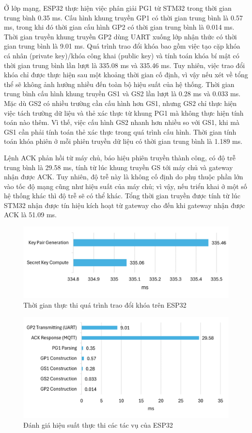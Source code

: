 Ở lớp mạng, ESP32 thực hiện việc phân giải PG1 từ STM32 trong thời gian trung bình 0.35 ms. Cấu hình khung truyền GP1 có thời gian trung bình là 0.57 ms, trong khi đó thời gian cấu hình GP2 có thời gian trung bình là 0.014 ms. Thời gian truyền khung truyền GP2 dùng UART xuống lớp nhận thức có thời gian trung bình là 9.01 ms. Quá trình trao đổi khóa bao gồm việc tạo cặp khóa cá nhân (private key)/khóa công khai (public key) và tính toán khóa bí mật có thời gian trung bình lần lượt là 335.08 ms và 335.46 ms. Tuy nhiên, việc trao đổi khóa chỉ được thực hiện sau một khoảng thời gian cố định, vì vậy nếu xét về tổng thể sẽ không ảnh hưởng nhiều đến toàn bộ hiệu suất của hệ thống. Thời gian trung bình cấu hình khung truyền GS1 và GS2 lần lượt là 0.28 ms và 0.033 ms. Mặc dù GS2 có nhiều trường cần cấu hình hơn GS1, nhưng GS2 chỉ thực hiện việc tách trường dữ liệu và thẻ xác thực từ khung PG1 mà không thực hiện tính toán nào thêm. Vì thế, việc cấu hình GS2 nhanh hơn nhiều so với GS1, khi mà GS1 cần phải tính toán thẻ xác thực trong quá trình cấu hình. Thời gian tính toán khóa phiên ở mỗi phiên truyền dữ liệu có thời gian trung bình là 1.189 ms.

Lệnh ACK phản hồi từ máy chủ, báo hiệu phiên truyền thành công, có độ trễ trung bình là 29.58 ms, tính từ lúc khung truyền GS tới máy chủ và gateway nhận được ACK. Tuy nhiên, độ trễ này là không cố định do phụ thuộc phần lớn vào tốc độ mạng cũng như hiệu suất của máy chủ; vì vậy, nếu triển khai ở một số hệ thống khác thì độ trễ sẽ có thể khác. Tổng thời gian truyền được tính từ lúc STM32 nhận được tín hiệu kích hoạt từ gateway cho đến khi gateway nhận được ACK là 51.09 ms.

\begin{figure}[h]
    \centering
    \includegraphics[width=0.8\linewidth]{ke.png}
    \caption{Thời gian thực thi quá trình trao đổi khóa trên ESP32}
    \label{fig:ke}
\end{figure}

\begin{figure}[h]
    \centering
    \includegraphics[width=0.8\linewidth]{esp32.png}
    \caption{Đánh giá hiệu suất thực thi các tác vụ của ESP32}
    \label{fig:esp32}
\end{figure}

